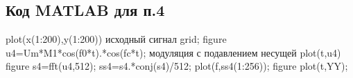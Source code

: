 \documentclass[10pt,a4paper]{article}
\begin{document}
\subsection{Код MATLAB для п.4}
 plot(x(1:200),y(1:200)) исходный сигнал\newline
grid;\newline
figure\newline
u4=Um*M1*cos(f0*t).*cos(fc*t); модуляция с подавлением несущей\newline
plot(t,u4) \newline
figure\newline
s4=fft(u4,512);\newline
ss4=s4.*conj(s4)/512;\newline
plot(f,ss4(1:256));
figure\newline
plot(t,YY);\newline
\end{document}

